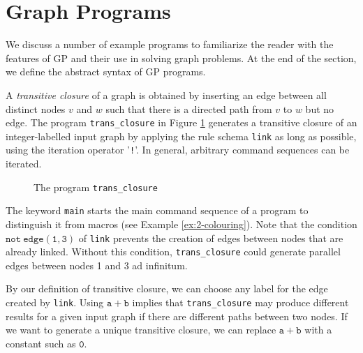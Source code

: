 \section{Graph Programs}
\label{sec:programs}

We discuss a number of example programs to familiarize the reader with the features of GP and their use in solving graph problems. At the end of the section, we define the abstract syntax of GP programs. 

\begin{example}
\label{ex:trans_closure}

A \emph{transitive closure} of a graph is obtained by inserting an edge between all distinct nodes $v$ and $w$ such that there is a directed path from $v$ to $w$ but no edge. The program \texttt{trans\_closure} in Figure \ref{fig:trans_closure} generates a transitive closure of an integer-labelled input graph by applying the rule schema \texttt{link} as long as possible, using the iteration operator '\texttt{!}'. In general, arbitrary command sequences can be iterated. 

\begin{figure}[htb]
 \begin{center}
  
 \end{center}
\caption{The program \texttt{trans\_closure}\label{fig:trans_closure}}
\end{figure}

The keyword \texttt{main} starts the main command sequence of a program to distinguish it from macros (see Example \ref{ex:2-colouring}). Note that the condition $\mathtt{not\: edge(1,3)}$ of \texttt{link} prevents the creation of edges between nodes that are already linked. Without this condition, \texttt{trans\_closure} could generate parallel edges between nodes 1 and 3 ad infinitum. 

By our definition of transitive closure, we can choose any label for the edge created by \texttt{link}. Using $\mathtt{a+b}$ implies that \texttt{trans\_closure} may produce different results for a given input graph if there are different paths between two nodes. If we want to generate a unique transitive closure, we can replace $\mathtt{a+b}$ with a constant such as $\mathtt{0}$.
\end{example}

